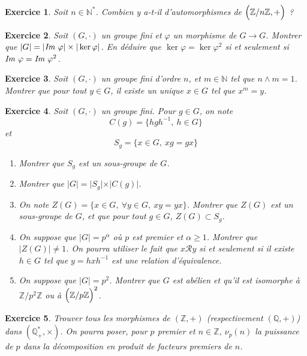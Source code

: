 \documentclass[12pt]{article}
\newtheorem{exercise}{Exercice}[section]
\theoremstyle{remark}
\theoremstyle{remark}
\newcommand{\Q}{\mathbb{Q}}
\newcommand{\N}{\mathbb{N}}
\newcommand{\Z}{\mathbb{Z}}
\newcommand{\im}{\emph{Im }}
\begin{document}
\begin{exercise}
	Soit $n\in\N^*$. Combien y a-t-il d'automorphismes de $\Bigl(\Z/n\Z,
	+\Bigr)$ ?
\end{exercise}

\begin{exercise}
	Soit $(G,\cdot)$ un groupe fini et $\varphi$ un morphisme de $G\to G$.
	Montrer que $\vert G\vert=\vert\im\varphi\vert\times\vert\ker\varphi\vert$.
	En déduire que $\ker\varphi=\ker\varphi^2$ si et seulement si
	$\im\varphi=\im\varphi^2$. 
\end{exercise}

\begin{exercise}
	Soit $(G,\cdot)$ un groupe fini d'ordre $n$, et $m\in\N$ tel que $n\wedge m=1$.
	Montrer que pour tout $y\in G$, il existe un unique $x\in G$ tel que $x^m=y$.
\end{exercise}

\begin{exercise}
	Soit $(G,\cdot)$ un groupe fini. Pour $g\in G$, on note 
	$$C(g)=\{hgh^{-1},~h\in G\}$$
	et 
	$$S_{g}=\{x\in G,~xg=gx\}$$
	\begin{enumerate}
		\item Montrer que $S_{g}$ est un sous-groupe de $G$.
		\item Montrer que $\vert G\vert=\vert S_{g}\vert\times\vert C(g)\vert$.
		\item On note $Z(G)=\{x\in G,~\forall y\in G,~xy=yx\}$. Montrer que
		$Z(G)$ est un sous-groupe de $G$, et que pour tout $g\in G$,
		$Z(G)\subset S_{g}$.
		\item On suppose que $\vert G\vert=p^{\alpha}$ où $p$ est premier et
		$\alpha\geqslant1$. Montrer que $\vert Z(G)\vert\neq1$. On pourra
		utiliser le fait que $x\mathcal{R}y$ si et seulement si il existe $h\in
		G$ tel que $y=hxh^{-1}$ est une relation d'équivalence.
		\item On suppose que $\vert G\vert=p^{2}$. Montrer que $G$ est abélien
		et qu'il est isomorphe à $\Z/p^2\Z$ ou à $\Bigl(\Z/p\Z\Bigr)^2$.
	\end{enumerate}
\end{exercise}

\begin{exercise}
	Trouver tous les morphismes de $(\Z,+)$ (respectivement $(\Q,+)$) dans
	$(\Q_{+}^*,\times)$. On pourra poser, pour $p$ premier et $n\in\Z$,
	$\nu_{p}(n)$ la puissance de $p$ dans la décomposition en produit de
	facteurs premiers de $n$.
\end{exercise}
\end{document}

